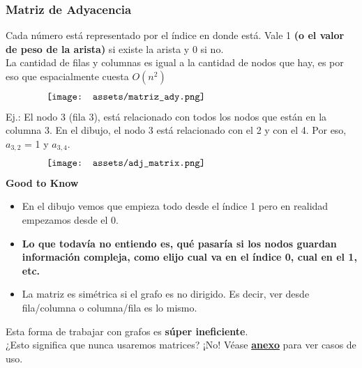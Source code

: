 \documentclass[10pt,a4paper]{article}
\begin{document}
\subsubsection*{Matriz de Adyacencia}
Cada número está representado por el índice en donde está. Vale 1 \textbf{(o el valor de peso de la arista)} si existe la arista y 0 si no. \\
La cantidad de filas y columnas es igual a la cantidad de nodos que hay, es por eso que espacialmente cuesta $O(n^{2})$
\[\begin{minipage}[b]{0.8\textwidth}
    \texttt{[image: assets/matriz\_ady.png]}
\end{minipage}\]
Ej.: El nodo 3 (fila 3), está relacionado con todos los nodos que están en la columna 3. En el dibujo, el nodo 3 está relacionado con el 2 y con el 4. Por eso, $a_{3, 2}$ = 1 y $a_{3, 4}$. 
\[\begin{minipage}[b]{0.8\textwidth}
    \texttt{[image: assets/adj\_matrix.png]}
\end{minipage}\]
\textbf{Good to Know}
\begin{itemize}
    \item En el dibujo vemos que empieza todo desde el índice 1 pero en realidad empezamos desde el 0. 
    \item \textbf{Lo que todavía no entiendo es, qué pasaría si los nodos guardan información compleja, como elijo cual va en el índice 0, cual en el 1, etc.} 
    \item La matriz es simétrica si el grafo es no dirigido. Es decir, ver desde fila/columna o columna/fila es lo mismo. 
\end{itemize}
Esta forma de trabajar con grafos es \textbf{súper ineficiente}. \\
¿Esto significa que nunca usaremos matrices? ¡No! Véase \hyperref[subsec:representacion_grafos_practica]{\textbf{anexo}} para ver casos de uso.
\end{document}
